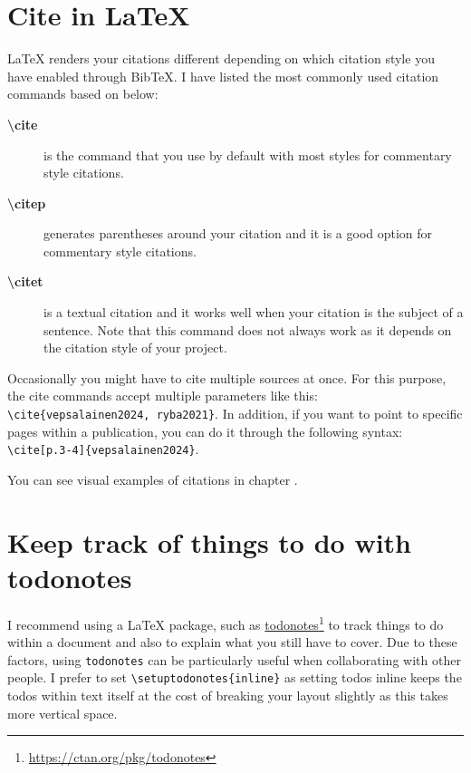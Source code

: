 
\section{Cite in LaTeX}
\label{sec:citing-in-latex}

LaTeX renders your citations different depending on which citation style you have enabled through BibTeX.
I have listed the most commonly used citation commands based on \citep{natbib2024} below:

\begin{description}
    \item[\textbf{\textbackslash cite}] is the command that you use by default with most styles for commentary style citations.
    \item[\textbf{\textbackslash citep}] generates parentheses around your citation and it is a good option for commentary style citations.
    \item[\textbf{\textbackslash citet}] is a textual citation and it works well when your citation is the subject of a sentence. Note that this command does not always work as it depends on the citation style of your project.
\end{description}

Occasionally you might have to cite multiple sources at once.
For this purpose, the cite commands accept multiple parameters like this: \texttt{\textbackslash cite\{vepsalainen2024, ryba2021\}}. In addition, if you want to point to specific pages within a publication, you can do it through the following syntax: \texttt{\textbackslash cite[p.3-4]\{vepsalainen2024\}}.

You can see visual examples of citations in chapter .

\section{Keep track of things to do with todonotes}

I recommend using a LaTeX package, such as \href{https://ctan.org/pkg/todonotes}{todonotes}\footnote{\url{https://ctan.org/pkg/todonotes}} to track things to do within a document and also to explain what you still have to cover.
Due to these factors, using \texttt{todonotes} can be particularly useful when collaborating with other people.
I prefer to set \texttt{\textbackslash setuptodonotes\{inline\}} as setting todos inline keeps the todos within text itself at the cost of breaking your layout slightly as this takes more vertical space.


